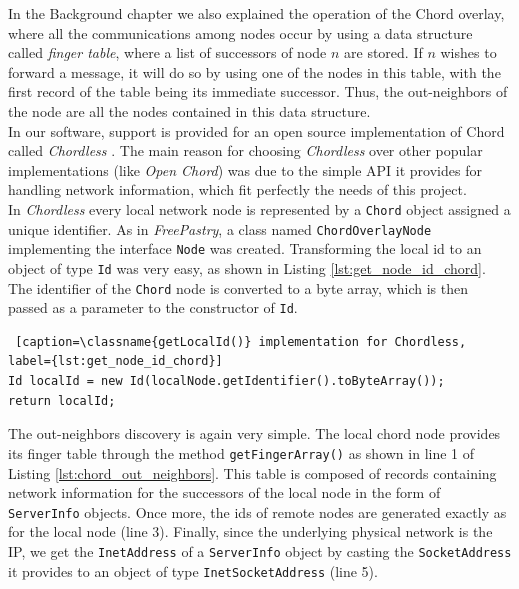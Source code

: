 \documentclass[a4paper,11pt,twoside]{report}
\newcommand{\classname}[1]{\texttt{#1}}
\begin{document}
\begin{description}
In the Background chapter we also explained the operation of the Chord overlay, where all the communications among nodes occur by using a data structure called \textit{finger table}, where a list of successors of node $n$ are stored. If $n$ wishes to forward a message, it will do so by using one of the nodes in this table, with the first record of the table being its immediate successor. Thus, the out-neighbors of the node are all the nodes contained in this data structure. \\

In our software, support is provided for an open source implementation of Chord called \textit{Chordless} \cite{Chordless}. The main reason for choosing \textit{Chordless} over other popular implementations (like \textit{Open Chord}) was due to the simple API it provides for handling network information, which fit perfectly the needs of this project.\\

In \textit{Chordless} every local network node is represented by a \classname{Chord} object assigned a unique identifier. As in \textit{FreePastry}, a class named \classname{ChordOverlayNode} implementing the interface \classname{Node} was created. Transforming the local id to an object of type \classname{Id} was very easy, as shown in Listing \ref{lst:get_node_id_chord}. The identifier of the \classname{Chord} node is converted to a byte array, which is then passed as a parameter to the constructor of \classname{Id}.

\begin{lstlisting} [caption=\classname{getLocalId()} implementation for Chordless, label={lst:get_node_id_chord}]
Id localId = new Id(localNode.getIdentifier().toByteArray());
return localId;
\end{lstlisting}

The out-neighbors discovery is again very simple. The local chord node provides its finger table through the method \classname{getFingerArray()} as shown in line 1 of Listing \ref{lst:chord_out_neighbors}. This table is composed of records containing network information for the successors of the local node in the form of \classname{ServerInfo} objects. Once more, the ids of remote nodes are generated exactly as for the local node (line 3). Finally, since the underlying physical network is the IP, we get the \classname{InetAddress} of a \classname{ServerInfo} object by casting the \classname{SocketAddress} it provides to an object of type \classname{InetSocketAddress} (line 5).


\end{description}
\end{document}
